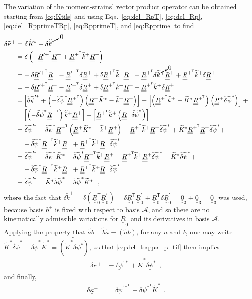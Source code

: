 \documentclass[12pt,a4paper,oneside,english]{abntex2} %
\newcommand{\vect}[1]{\underline{#1}}
\def\tens#1{\underline{\underline{#1}}}
\def\til#1{\widetilde{#1}}
\def\lb{\left[}
\def\rb{\right]}
\def\lp{\left(}
\def\rp{\right)}
\def\T{\mathsf{T}}
\def\A{\mathcal{A}}
\def\bp{b^+}
\def\zthree{\tens{0}_3}
\def\R{\tens{R}}
\def\Rp{\R^+}
\def\RpT{\R^{+^\T}}
\def\RpprimeT{\R^{{\prime +}^\T}}
\def\Rz{\R_0}
\def\Rzp{\R^{\prime}_0}
\def\RzT{\R^\T_0}
\def\kap{\vect{\kappa}}
\def\kapp{\kap^{+}}
\def\kappT{\kap^{+^\T}}
\def\kapptil{\til{\kappa}^{+}}
\def\ktil{\til{k}}
\def\ktilp{\ktil^{+}}
\def\Ktil{\til{K}}
\def\Ktils{\Ktil^{*}}
\def\delpsi{\vect{\delta\psi}}
\def\delpsis{\delpsi^*}
\def\delpsisT{\delpsi^{*^\T}}
\def\delpsips{\delpsi^{\prime*}}
\def\delpsipsT{\delpsi^{\prime*^\T}}
\def\delpsitil{\til{\delta\psi}}
\def\delpsitils{\delpsitil^*}
\def\delpsitilps{\til{\delta\psi}^{\prime*}}
\begin{document}
\begin{apendicesenv}
The variation of the moment-strains' vector product operator can be obtained starting from \cref{eq:Ktils} and using Eqs.~\eqref{eq:del_RpT}, \eqref{eq:del_Rp}, \eqref{eq:del_RpprimeTRp}, \eqref{eq:RpprimeT}, and \eqref{eq:Rpprime} to find
\begin{align}
    \delta\kapptil =& \;\delta\Ktils - \cancelto{0}{\delta\ktilp} \nonumber 
    \\
    =& \;\delta\lp-\RpprimeT\Rp + \RpT\ktilp\Rp\rp \nonumber 
    \\
    =& -\delta\RpprimeT\Rp - \RpprimeT\delta\Rp + \delta\RpT\ktilp\Rp + \RpT\cancelto{0}{\delta\ktilp}\Rp + \RpT\ktilp\delta\Rp
    \nonumber 
    \\
    =& -\delta\RpprimeT\Rp - \RpprimeT\delta\Rp + \delta\RpT\ktilp\Rp + \RpT\ktilp\delta\Rp \nonumber 
    \\
    =& \lb\delpsitilps + \lp-\delpsitils\RpT\rp \lp\Rp\Ktils - \ktilp\Rp\rp\rb - \lb\lp\RpT\ktilp - \Ktils\RpT\rp\lp\Rp\delpsitils\rp\rb + \nonumber 
    \\ 
    & \lb\lp-\delpsitils\RpT\rp\ktilp\Rp\rb + \lb\RpT\ktilp\lp\Rp\delpsitils\rp\rb \nonumber 
    \\
    =& \;\delpsitilps - \delpsitils\RpT\lp\Rp\Ktils - \ktilp\Rp\rp - \RpT\ktilp\Rp\delpsitils + \Ktils\RpT\Rp\delpsitils + \nonumber 
    \\ 
    & -\delpsitils\RpT\ktilp\Rp + \RpT\ktilp\Rp\delpsitils \nonumber 
    \\
    =& \;\delpsitilps - \delpsitils\Ktils + \delpsitils\RpT\ktilp\Rp - \RpT\ktilp\Rp\delpsitils + \Ktils\delpsitils + \nonumber 
    \\ 
    & -\delpsitils\RpT\ktilp\Rp + \RpT\ktilp\Rp\delpsitils \nonumber 
    \\
    =& \;\delpsitilps + \Ktils\delpsitils - \delpsitils\Ktils \ \ ,
    \label{eq:del_kappa_p_til}
\end{align}
where the fact that $\delta\ktilp = \delta\lp\RzT\Rzp\rp = \delta\RzT\Rzp + \RzT\delta\Rzp = \zthree + \zthree = \zthree$ was used, because basis $\bp$ is fixed with respect to basis $\A$, and so there are no kinematically admissible variations for $\Rz$ and its derivatives in basis $\A$. Applying the property that $\til{a}\til{b}-\til{b}\til{a} = \til{\lp\til{a}\vect{b}\rp}$, for any $\vect{a}$ and $\vect{b}$, one may write $\Ktils\delpsitils - \delpsitils\Ktils = \til{\lp\Ktils\delpsis\rp}$, so that \cref{eq:del_kappa_p_til} then implies
\begin{align}
    \delta\kapp &= \delpsips + \Ktils\delpsis \ \ ,
    \label{eq:del_kappa_p} 
\end{align}
and finally,
\begin{align}
    \delta\kappT &= \delpsipsT - \delpsisT\Ktils \ \ .
    \label{eq:del_kappa_pT}
\end{align}


\end{apendicesenv}
\end{document}

